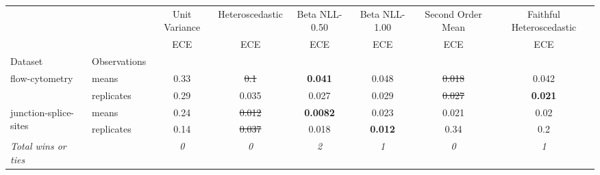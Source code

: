 \begin{tabular}{ll|c|c|c|c|c|c}
\toprule
{} & {} & {Unit Variance} & {Heteroscedastic} & {Beta NLL-0.50} & {Beta NLL-1.00} & {Second Order Mean} & {Faithful Heteroscedastic} \\
{} & {} & {ECE} & {ECE} & {ECE} & {ECE} & {ECE} & {ECE} \\
{Dataset} & {Observations} & {} & {} & {} & {} & {} & {} \\
\midrule
\multirow[t]{2}{*}{flow-cytometry} & means & 0.33 & \sout{0.1} & \textbf{0.041} & 0.048 & \sout{0.018} & 0.042 \\
 & replicates & 0.29 & 0.035 & 0.027 & 0.029 & \sout{0.027} & \textbf{0.021} \\
\multirow[t]{2}{*}{junction-splice-sites} & means & 0.24 & \sout{0.012} & \textbf{0.0082} & 0.023 & 0.021 & 0.02 \\
 & replicates & 0.14 & \sout{0.037} & 0.018 & \textbf{0.012} & 0.34 & 0.2 \\
\textit{{Total wins or ties}} &  & \textit{0} & \textit{0} & \textit{2} & \textit{1} & \textit{0} & \textit{1} \\
\bottomrule
\end{tabular}
